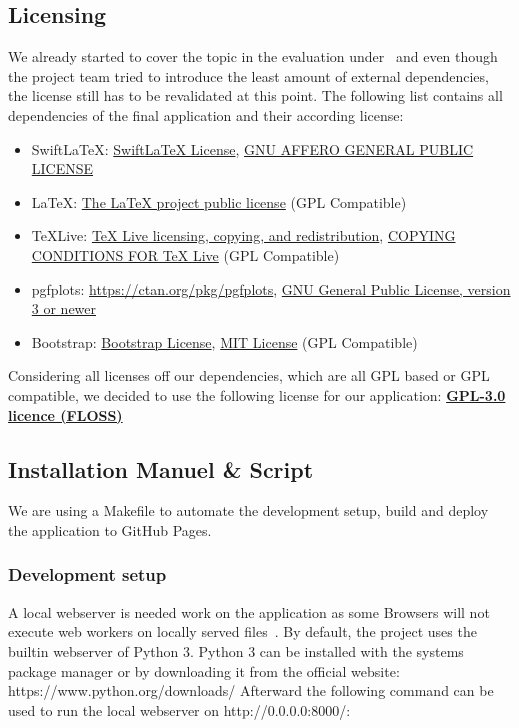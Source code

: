 \subsection{Licensing}\label{subsec:licensing}
We already started to cover the topic in the evaluation under~ and even though the project team tried to introduce the least amount of external dependencies,
the license still has to be revalidated at this point.
The following list contains all dependencies of the final application and their according license:
\begin{itemize}
    \item SwiftLaTeX: \href{https://github.com/SwiftLaTeX/SwiftLaTeX/blob/master/LICENSE}{SwiftLaTeX License}, \href{https://www.gnu.org/licenses/agpl-3.0.en.html}{GNU AFFERO GENERAL PUBLIC LICENSE}
    \item LaTeX: \href{https://www.latex-project.org/lppl.txt}{The LaTeX project public license} (GPL Compatible)
    \item TeXLive: \href{https://www.tug.org/texlive/copying.html}{TeX Live licensing, copying, and redistribution}, \href{https://www.tug.org/texlive/LICENSE.TL}{COPYING CONDITIONS FOR TeX Live} (GPL Compatible)
    \item pgfplots: \href{https://ctan.org/pkg/pgfplots}{https://ctan.org/pkg/pgfplots}, \href{https://www.gnu.org/licenses/gpl-3.0.en.html}{GNU General Public License, version 3 or newer}
    \item Bootstrap: \href{https://github.com/twbs/bootstrap/blob/main/LICENSE}{Bootstrap License}, \href{https://en.wikipedia.org/wiki/MIT_License}{MIT License} (GPL Compatible)
\end{itemize}

Considering all licenses off our dependencies, which are all GPL based or GPL compatible,
we decided to use the following license for our application: \textbf{\href{https://www.gnu.org/licenses/gpl-3.0.en.html}{GPL-3.0 licence (FLOSS)}}

\subsection{Installation Manuel \& Script}\label{subsec:installation-manuel-and-script}
We are using a Makefile to automate the development setup, build and deploy the application to GitHub Pages.

\subsubsection{Development setup}
A local webserver is needed work on the application as some Browsers will not execute web workers on locally served files~\cite{stackoverflow_chrome_cant_load_web_worker}.
By default, the project uses the builtin webserver of Python 3.
Python 3 can be installed with the systems package manager or by downloading it from the official website: https://www.python.org/downloads/
Afterward the following command can be used to run the local webserver on http://0.0.0.0:8000/:

